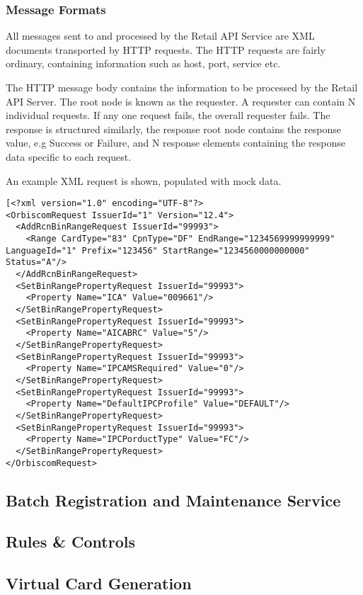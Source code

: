 \documentclass[a4paper, 11pt, titlepage]{article}
\begin{document}
\subsubsection{Message Formats}
All messages sent to and processed by the Retail API Service are XML documents transported by HTTP requests. The HTTP requests are fairly ordinary, containing information such as host, port, service etc.

The HTTP message body contains the information to be processed by the Retail API Server. The root node is known as the requester. A requester can contain N individual requests. If any one request fails, the overall requester fails. The response is structured similarly, the response root node contains the response value, e.g Success or Failure, and N response elements containing the response data specific to each request.

An example XML request is shown, populated with mock data.
\begin{verbatim}
[<?xml version="1.0" encoding="UTF-8"?>
<OrbiscomRequest IssuerId="1" Version="12.4">
  <AddRcnBinRangeRequest IssuerId="99993">
    <Range CardType="83" CpnType="DF" EndRange="1234569999999999" LanguageId="1" Prefix="123456" StartRange="1234560000000000" Status="A"/>
  </AddRcnBinRangeRequest>
  <SetBinRangePropertyRequest IssuerId="99993">
    <Property Name="ICA" Value="009661"/>
  </SetBinRangePropertyRequest>
  <SetBinRangePropertyRequest IssuerId="99993">
    <Property Name="AICABRC" Value="5"/>
  </SetBinRangePropertyRequest>
  <SetBinRangePropertyRequest IssuerId="99993">
    <Property Name="IPCAMSRequired" Value="0"/>
  </SetBinRangePropertyRequest>
  <SetBinRangePropertyRequest IssuerId="99993">
    <Property Name="DefaultIPCProfile" Value="DEFAULT"/>
  </SetBinRangePropertyRequest>
  <SetBinRangePropertyRequest IssuerId="99993">
    <Property Name="IPCPorductType" Value="FC"/>
  </SetBinRangePropertyRequest>
</OrbiscomRequest>
\end{verbatim}


\subsection{Batch Registration and Maintenance Service}

\subsection{Rules \& Controls}

\subsection{Virtual Card Generation}
\end{document}

